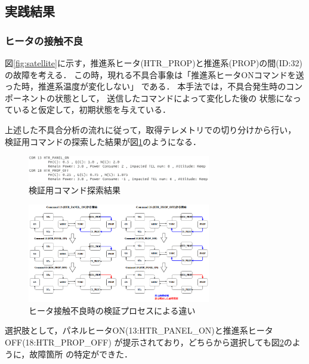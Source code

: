 \documentclass[11pt]{jsarticle}%
\begin{document}
\begin{multicols}{2}
\subsection{実践結果}
  \vspace{-1zh}
  \subsubsection{ヒータの接触不良}
図\ref{fig:satellite}に示す，推進系ヒータ(HTR\_PROP)と推進系(PROP)の間(ID:32)
の故障を考える．
この時，現れる不具合事象は「推進系ヒータONコマンドを送った時，推進系温度が変化しない」
である．
本手法では，不具合発生時のコンポーネントの状態として，
送信したコマンドによって変化した後の
状態になっていると仮定して，初期状態を与えている．

上述した不具合分析の流れに従って，取得テレメトリでの切り分けから行い，
検証用コマンドの探索した結果が図\ref{fig:COM_candidate}のようになる．
 \begin{figure}[H]
   \centering
     \includegraphics[width=8.0cm]{../figure/COM_candidate.png}
     \caption{検証用コマンド探索結果}
     \label{fig:COM_candidate}%
 \end{figure}
\begin{figure}[H]
  \centering
    \includegraphics[width=8.0cm]{../figure/COM_process_HTR_PROP_fault.png}
    \caption{ヒータ接触不良時の検証プロセスによる違い}
    \label{fig:COM_process}
\end{figure}
選択肢として，パネルヒータON(13:HTR\_PANEL\_ON)と推進系ヒータOFF(18:HTR\_PROP\_OFF)
が提示されており，どちらから選択しても図\ref{fig:COM_process}のように，故障箇所
の特定ができた．

\end{multicols}
\end{document}
